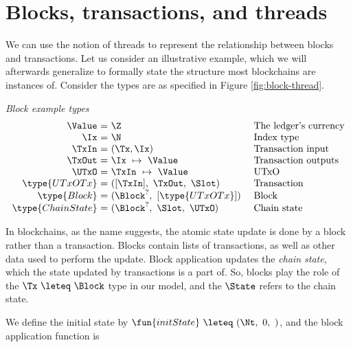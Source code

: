 \section{Blocks, transactions, and threads}
\label{sec:blockchain}

We can use the notion of threads to represent the relationship between blocks
and transactions.
Let us consider an illustrative example, which we will afterwards generalize to
formally state the structure most blockchains are instances of.
Consider the types are as specified in Figure \ref{fig:block-thread}.

\begin{figure*}[htb]
  \emph{Block example types}
  \begin{equation*}
    \begin{array}{r@{~=~}l@{~~~~}lr}
      \Value
      & \Z
      & \text{The ledger's currency} \\
      \Ix
      & \N
      & \text{Index type} \\
      \TxIn
      & (\Tx, \Ix)
      & \text{Transaction input} \\
      \TxOut
      & \Ix~\mapsto~\Value
      & \text{Transaction outputs} \\
      \UTxO
      & \TxIn~\mapsto~\Value
      & \text{UTxO} \\
      \type{UTxOTx}
      & ([\TxIn],~\TxOut,~\Slot)
      & \text{Transaction} \\
      \type{Block}
      & (\Block^?,~[\type{UTxOTx}])
      & \text{Block} \\
      \type{ChainState}
      & (\Block^?,~\Slot,~\UTxO)
      & \text{Chain state} \\
    \end{array}
  \end{equation*}
  \caption{Types of a block-based ledger}
  \label{fig:block-thread}
\end{figure*}

In blockchains, as the name suggests, the atomic state update
is done by a block rather than a transaction. Blocks contain lists of transactions, as well
as other data used to perform the update.
Block application updates the \emph{chain state}, which the state updated by
transactions is a part of. So, blocks play the role of the $\Tx~\leteq~\Block$ type in our
model, and the $\State$ refers to the chain state.

We define the initial state by $\fun{initState}~\leteq~(\Nt,~0,~\empty)$, and the block application function is

